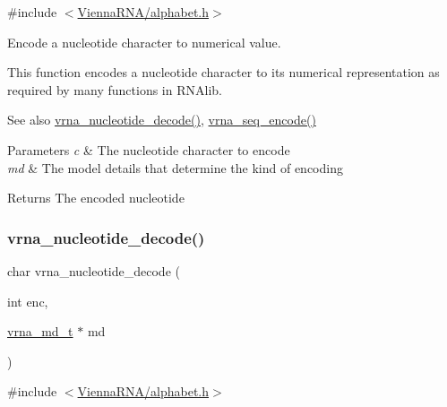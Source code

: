 {\ttfamily \#include $<$\hyperlink{alphabet_8h}{Vienna\+R\+N\+A/alphabet.\+h}$>$}



Encode a nucleotide character to numerical value. 

This function encodes a nucleotide character to its numerical representation as required by many functions in R\+N\+Alib.

\begin{DoxySeeAlso}{See also}
\hyperlink{group__alphabet__utils_ga48ef585e697be9c8a08ed68c655e29b6}{vrna\+\_\+nucleotide\+\_\+decode()}, \hyperlink{group__alphabet__utils_ga636e7d6f888fd639587296a5eddea660}{vrna\+\_\+seq\+\_\+encode()}
\end{DoxySeeAlso}

\begin{DoxyParams}{Parameters}
{\em c} & The nucleotide character to encode \\
\hline
{\em md} & The model details that determine the kind of encoding \\
\hline
\end{DoxyParams}
\begin{DoxyReturn}{Returns}
The encoded nucleotide 
\end{DoxyReturn}
\mbox{\label{group__alphabet__utils_ga48ef585e697be9c8a08ed68c655e29b6}} 
\subsubsection{\texorpdfstring{vrna\+\_\+nucleotide\+\_\+decode()}{vrna\_nucleotide\_decode()}}
{\footnotesize\ttfamily char vrna\+\_\+nucleotide\+\_\+decode (\begin{DoxyParamCaption}\item[{int}]{enc,  }\item[{\hyperlink{group__model__details_ga1f8a10e12a0a1915f2a4eff0b28ea17c}{vrna\+\_\+md\+\_\+t} $\ast$}]{md }\end{DoxyParamCaption})}



{\ttfamily \#include $<$\hyperlink{alphabet_8h}{Vienna\+R\+N\+A/alphabet.\+h}$>$}



